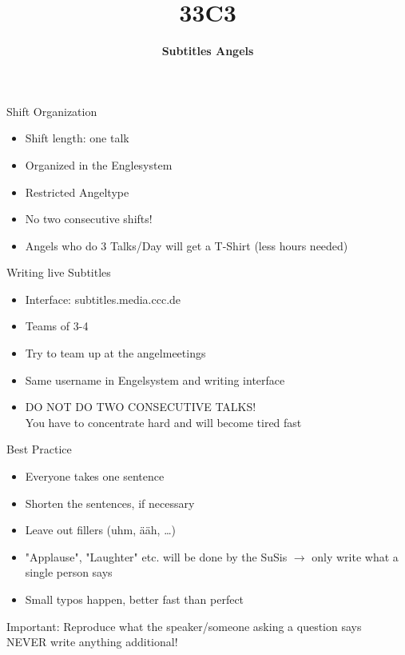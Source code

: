\documentclass[utf8,widescreen]{beamer}
\title{\Huge \textbf{33C3}}
\subtitle{\Large \textbf{Subtitles Angels}}
\date{}
\begin{document}
\begin{frame}{\titlepage}
\end{frame}

\begin{frame}{Shift Organization}
\pause
\begin{block}{}
\begin{itemize}\itemsep 14pt
\item{Shift length: one talk}
\pause
\item{Organized in the Englesystem}
\pause
\item{Restricted Angeltype}
\pause
\item{No two consecutive shifts!}
\pause
\item{Angels who do 3 Talks/Day will get a T-Shirt (less hours needed)}
\end{itemize}
\end{block}
\end{frame}

\begin{frame}{Writing live Subtitles}
\pause
\begin{block}{}
\begin{itemize}\itemsep 10pt
\item{Interface: subtitles.media.ccc.de}
\pause
\item{Teams of 3-4}
\pause
\item{Try to team up at the angelmeetings}
\pause
\item{Same username in Engelsystem and writing interface}
\pause
\item{\large DO NOT DO TWO CONSECUTIVE TALKS!\\
\normalsize You have to concentrate hard and will become tired fast}
\end{itemize}
\end{block}
\end{frame}

\begin{frame}{Best Practice}
\pause
\begin{block}{}
\begin{itemize}\itemsep 10pt
\item{Everyone takes one sentence}
\pause
\item{Shorten the sentences, if necessary}
\pause
\item{Leave out fillers (uhm, ääh, \dots)}
\pause
\item{"Applause", "Laughter" etc. will be done by the SuSis $\rightarrow$ only write what a single person says}
\pause
\item{Small typos happen, better fast than perfect}
\end{itemize}
\pause
\end{block}
\begin{block}{Important:}
Reproduce what the speaker/someone asking a question says\\
NEVER write anything additional!
\end{block}
\end{frame}
\end{document}
